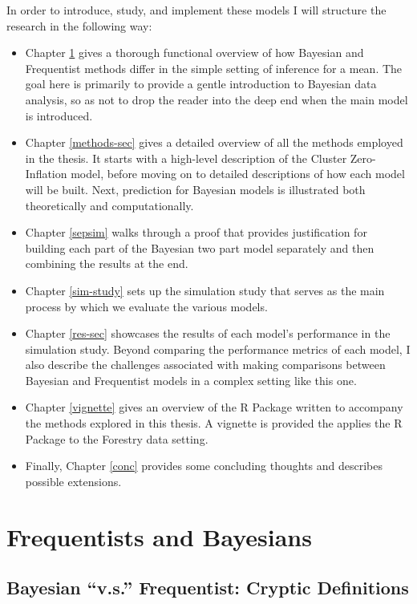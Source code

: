 \documentclass[12pt,twoside]{reedthesis}
\begin{document}
In order to introduce, study, and implement these models I will structure the research in the following way:
\begin{itemize}
\item
  Chapter \ref{bayes-freq} gives a thorough functional overview of how Bayesian and Frequentist methods differ in the simple setting of inference for a mean. The goal here is primarily to provide a gentle introduction to Bayesian data analysis, so as not to drop the reader into the deep end when the main model is introduced.
\item
  Chapter \ref{methods-sec} gives a detailed overview of all the methods employed in the thesis. It starts with a high-level description of the Cluster Zero-Inflation model, before moving on to detailed descriptions of how each model will be built. Next, prediction for Bayesian models is illustrated both theoretically and computationally.
\item
  Chapter \ref{sepsim} walks through a proof that provides justification for building each part of the Bayesian two part model separately and then combining the results at the end.
\item
  Chapter \ref{sim-study} sets up the simulation study that serves as the main process by which we evaluate the various models.
\item
  Chapter \ref{res-sec} showcases the results of each model's performance in the simulation study. Beyond comparing the performance metrics of each model, I also describe the challenges associated with making comparisons between Bayesian and Frequentist models in a complex setting like this one.
\item
  Chapter \ref{vignette} gives an overview of the R Package written to accompany the methods explored in this thesis. A vignette is provided the applies the R Package to the Forestry data setting.
\item
  Finally, Chapter \ref{conc} provides some concluding thoughts and describes possible extensions.
\end{itemize}
\hypertarget{bayes-freq}{%
\chapter{Frequentists and Bayesians}\label{bayes-freq}}

\hypertarget{bayesian-v.s.-frequentist-cryptic-definitions}{%
\section{Bayesian ``v.s.'' Frequentist: Cryptic Definitions}\label{bayesian-v.s.-frequentist-cryptic-definitions}}
\end{document}
